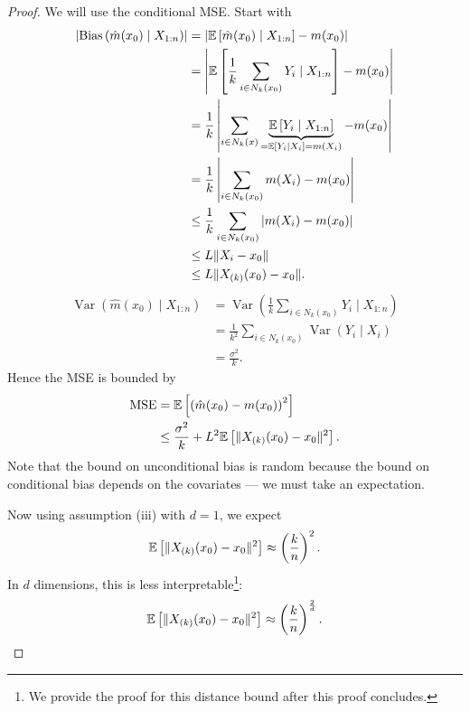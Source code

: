 \begin{proof}
	We will use the conditional MSE. Start with 
	\begin{align*}
		\left|\operatorname{Bias}\left(\hat{m}(x_0) \mid X_{1:n}\right)\right| &= \left|\mathbb{E}\left[\hat{m}(x_0) \mid X_{1:n}\right] - m(x_0)\right| \\
		&= \left| \mathbb{E}\left[\frac{1}{k} \sum_{i \in N_k(x_0)} Y_i \mid X_{1:n}\right] - m(x_0) \right| \\
		&= \frac{1}{k} \left| \sum_{i \in N_k(x)} \underbrace{\mathbb{E}\left[Y_i \mid X_{1:n}\right]}_{= \mathbb{E}\left[Y_i \mid X_i\right] = m(X_i)}  - m(x_0) \right|\\
																  &= \frac{1}{k} \left| \sum\limits_{i \in N_k(x_0)}^{} m(X_i) - m(x_0)\right| \\
																  &\le \frac{1}{k} \sum_{i \in N_k(x_0)} \left| m(X_i) - m(x_0) \right| \\
																  &\le L \| X_i - x_0 \| \\ 
																  &\le L \| X_{(k)}(x_0) - x_0 \|
	.\end{align*}
	\begin{align*}
		\operatorname{Var}\left(\hat{m}(x_0) \mid X_{1:n}\right) &= \operatorname{Var}\left(\frac{1}{k} \sum_{i \in N_k(x_0)} Y_i \mid X_{1:n}\right) \\
		&= \frac{1}{k^2} \sum_{i \in N_k(x_0)} \operatorname{Var}\left(Y_i \mid X_i\right) \\
		&= \frac{\sigma^2}{k}
	.\end{align*}
	Hence the MSE is bounded by
	\begin{align}
		\operatorname{MSE} &= \mathbb{E}\left[\left( \hat{m}(x_0) - m(x_0) \right)^2\right]  \\
			&\le \frac{\sigma^2}{k} + L^2 \mathbb{E}\left[\|X_{(k)}(x_0) - x_0\|^2\right] \label{1-12-1}
	.\end{align} 
	Note that the bound on unconditional bias is random because the bound on conditional bias depends on the covariates --- we must take an expectation.

	Now using assumption (iii) with $d=1$, we expect \[
		\mathbb{E}\left[\|X_{(k)}(x_0) - x_0\|^2\right] \approx \left( \frac{k}{n} \right)^2
	.\] 
	In $d$ dimensions, this is less interpretable\footnote{We provide the proof for this distance bound after this proof concludes.}: \[
		\mathbb{E}\left[\|X_{(k)}(x_0) - x_0\|^2\right] \approx \left( \frac{k}{n} \right)^{\frac{2}{d}}
	.\] 


\end{proof}
